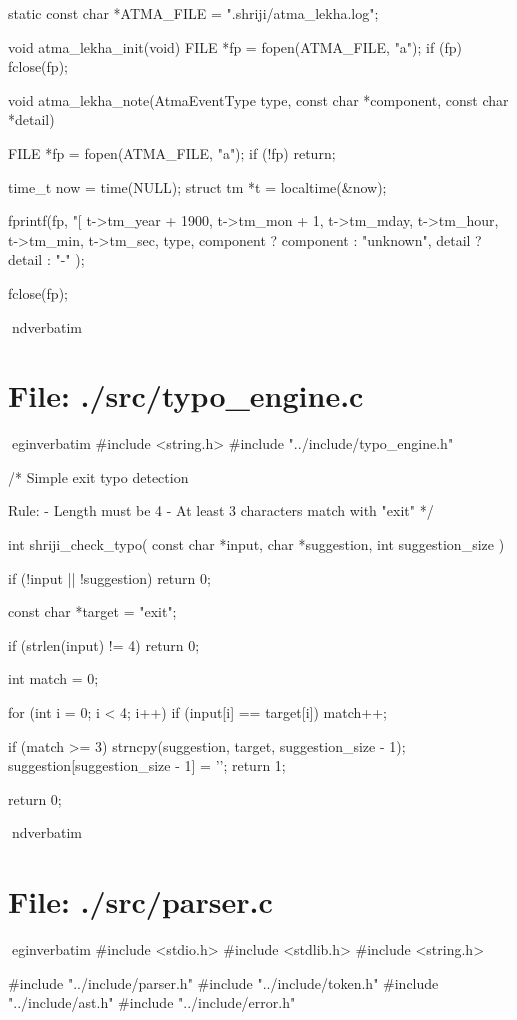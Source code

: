\documentclass{article}
\begin{document}
static const char *ATMA_FILE = ".shriji/atma_lekha.log";

void atma_lekha_init(void)
{
    FILE *fp = fopen(ATMA_FILE, "a");
    if (fp) fclose(fp);
}

void atma_lekha_note(AtmaEventType type,
                     const char *component,
                     const char *detail)
{
    FILE *fp = fopen(ATMA_FILE, "a");
    if (!fp) return;

    time_t now = time(NULL);
    struct tm *t = localtime(&now);

    fprintf(fp,
        "[%
        t->tm_year + 1900,
        t->tm_mon + 1,
        t->tm_mday,
        t->tm_hour,
        t->tm_min,
        t->tm_sec,
        type,
        component ? component : "unknown",
        detail ? detail : "-"
    );

    fclose(fp);
}
nd{verbatim}
\section*{File: ./src/typo_engine.c}
egin{verbatim}
#include <string.h>
#include "../include/typo_engine.h"

/*
    Simple exit typo detection

    Rule:
    - Length must be 4
    - At least 3 characters match with "exit"
*/

int shriji_check_typo(
    const char *input,
    char *suggestion,
    int suggestion_size
)
{
    if (!input || !suggestion)
        return 0;

    const char *target = "exit";

    if (strlen(input) != 4)
        return 0;

    int match = 0;

    for (int i = 0; i < 4; i++) {
        if (input[i] == target[i])
            match++;
    }

    if (match >= 3) {
        strncpy(suggestion, target, suggestion_size - 1);
        suggestion[suggestion_size - 1] = '\0';
        return 1;
    }

    return 0;
}
nd{verbatim}
\section*{File: ./src/parser.c}
egin{verbatim}
#include <stdio.h>
#include <stdlib.h>
#include <string.h>

#include "../include/parser.h"
#include "../include/token.h"
#include "../include/ast.h"
#include "../include/error.h"
\end{document}
